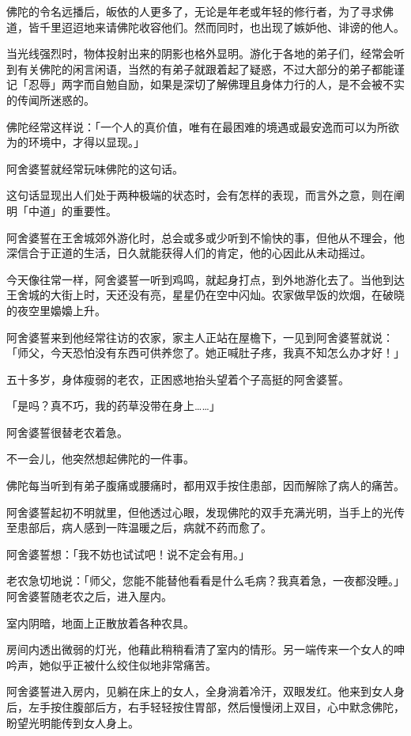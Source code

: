 \documentclass[twoside,openany]{book}
\begin{document}
佛陀的令名远播后，皈依的人更多了，无论是年老或年轻的修行者，为了寻求佛道，皆千里迢迢地来请佛陀收容他们。然而同时，也出现了嫉妒他、诽谤的他人。

当光线强烈时，物体投射出来的阴影也格外显明。游化于各地的弟子们，经常会听到有关佛陀的闲言闲语，当然的有弟子就跟着起了疑惑，不过大部分的弟子都能谨记「忍辱」两字而自勉自励，如果是深切了解佛理且身体力行的人，是不会被不实的传闻所迷惑的。

佛陀经常这样说：「一个人的真价值，唯有在最困难的境遇或最安逸而可以为所欲为的环境中，才得以显现。」

阿舍婆誓就经常玩味佛陀的这句话。

这句话显现出人们处于两种极端的状态时，会有怎样的表现，而言外之意，则在阐明「中道」的重要性。

阿舍婆誓在王舍城郊外游化时，总会或多或少听到不愉快的事，但他从不理会，他深信合于正道的生活，日久就能获得人们的肯定，他的心因此从未动摇过。

今天像往常一样，阿舍婆誓一听到鸡鸣，就起身打点，到外地游化去了。当他到达王舍城的大街上时，天还没有亮，星星仍在空中闪灿。农家做早饭的炊烟，在破晓的夜空里嬝嬝上升。

阿舍婆誓来到他经常往访的农家，家主人正站在屋檐下，一见到阿舍婆誓就说：「师父，今天恐怕没有东西可供养您了。她正喊肚子疼，我真不知怎么办才好！」

五十多岁，身体瘦弱的老农，正困惑地抬头望着个子高挺的阿舍婆誓。

「是吗？真不巧，我的药草没带在身上……」

阿舍婆誓很替老农着急。

不一会儿，他突然想起佛陀的一件事。

佛陀每当听到有弟子腹痛或腰痛时，都用双手按住患部，因而解除了病人的痛苦。

阿舍婆誓起初不明就里，但他透过心眼，发现佛陀的双手充满光明，当手上的光传至患部后，病人感到一阵温暖之后，病就不药而愈了。

阿舍婆誓想：「我不妨也试试吧！说不定会有用。」

老农急切地说：「师父，您能不能替他看看是什么毛病？我真着急，一夜都没睡。」阿舍婆誓随老农之后，进入屋内。

室内阴暗，地面上正散放着各种农具。

房间内透出微弱的灯光，他藉此稍稍看清了室内的情形。另一端传来一个女人的呻吟声，她似乎正被什么绞住似地非常痛苦。

阿舍婆誓进入房内，见躺在床上的女人，全身淌着冷汗，双眼发红。他来到女人身后，左手按住腹部后方，右手轻轻按住胃部，然后慢慢闭上双目，心中默念佛陀，盼望光明能传到女人身上。
\end{document}
